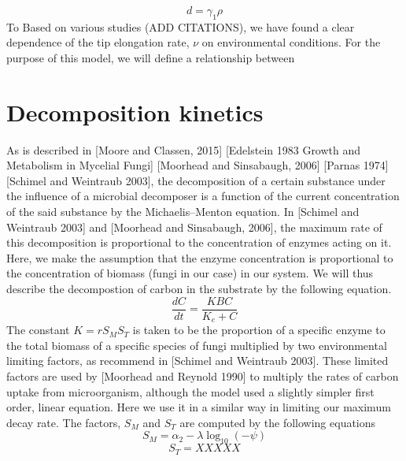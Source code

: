 \documentclass[10pt]{article}
\begin{document}
\begin{equation} \label {eq}
    d = \gamma_{1}\rho
\end{equation}
To 
Based on various studies (ADD CITATIONS), we have found a clear dependence of the tip elongation rate, $\nu$ on environmental conditions. For the purpose of this model, we will  define a relationship between 


\section*{Decomposition kinetics}
As is described in [Moore and Classen, 2015] [Edelstein 1983 Growth and Metabolism in Mycelial Fungi] [Moorhead and Sinsabaugh, 2006] [Parnas 1974] [Schimel and Weintraub 2003], the decomposition of a certain substance under the influence of a microbial decomposer is a function of the current concentration of the said substance by the Michaelis–Menton equation. In [Schimel and Weintraub 2003] and [Moorhead and Sinsabaugh, 2006], the maximum rate of this decomposition is proportional to the concentration of enzymes acting on it. Here, we make the assumption that the enzyme concentration is proportional to the concentration of biomass (fungi in our case) in our system. We will thus describe the decompostion of carbon in the substrate by the following equation.
\begin{equation} \label{eq}
    \frac{dC}{dt} = \frac{KBC}{K_{e}+C}
\end{equation}
The constant $K=rS_{M}S_{T}$ is taken to be the proportion of a specific enzyme to the total biomass of a specific species of fungi multiplied by two environmental limiting factors, as recommend in [Schimel and Weintraub 2003]. These limited factors are used by [Moorhead and Reynold 1990] to multiply the rates of carbon uptake from microorganism, although the model used a slightly simpler first order, linear equation. Here we use it in a similar way in limiting our maximum decay rate. The factors, $S_{M}$ and $S_{T}$ are computed by the following equations
\begin{equation} \label{eq}
    S_{M}=\alpha_{2} - \lambda \log_{10}(-\psi)
\end{equation}
\begin{equation} \label {eq}
    S_{T} = XXXXX
\end{equation}
\end{document}
